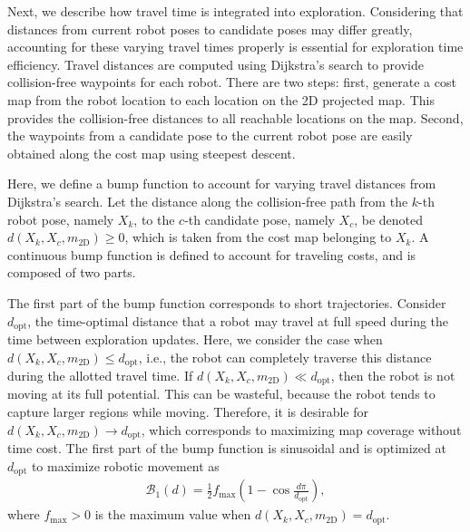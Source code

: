 \documentclass[smallextended]{svjour3}       %
\begin{document}
Next, we describe how travel time is integrated into exploration. Considering that distances from current robot poses to candidate poses may differ greatly, accounting for these varying travel times properly is essential for exploration time efficiency. Travel distances are computed using Dijkstra's search to provide collision-free waypoints for each robot. There are two steps: first, generate a cost map from the robot location to each location on the 2D projected map. This provides the collision-free distances to all reachable locations on the map. Second, the waypoints from a candidate pose to the current robot pose are easily obtained along the cost map using steepest descent. 

Here, we define a bump function to account for varying travel distances from Dijkstra's search. Let the distance along the collision-free path from the $k$-th robot pose, namely $X_k$, to the $c$-th candidate pose, namely $X_c$, be denoted $d(X_k,X_c,m_\text{2D})\geq0$, which is taken from the cost map belonging to $X_k$. A continuous bump function is defined to account for traveling costs, and is composed of two parts.  

The first part of the bump function corresponds to short trajectories. Consider $d_\text{opt}$, the time-optimal distance that a robot may travel at full speed during the time between exploration updates. Here, we consider the case when $d(X_k,X_c,m_\text{2D})\leq d_\text{opt}$, i.e., the robot can completely traverse this distance during the allotted travel time. If $d(X_k,X_c,m_\text{2D})\ll d_\text{opt}$, then the robot is not moving at its full potential. This can be wasteful, because the robot tends to capture larger regions while moving. Therefore, it is desirable for $d(X_k,X_c,m_\text{2D})\rightarrow d_\text{opt}$, which corresponds to maximizing map coverage without time cost. The first part of the bump function is sinusoidal and is optimized at $d_\text{opt}$ to maximize robotic movement as
\begin{align}
\label{eqn:BumpFunIncreasing}
\mathcal B_1(d)=\frac12 f_\text{max}\left(1-\cos{\frac{d\pi}{d_\text{opt}}}\right),
\end{align}
where $f_\text{max}>0$ is the maximum value when $d(X_k,X_c,m_\text{2D})=d_\text{opt}$.
\end{document}
